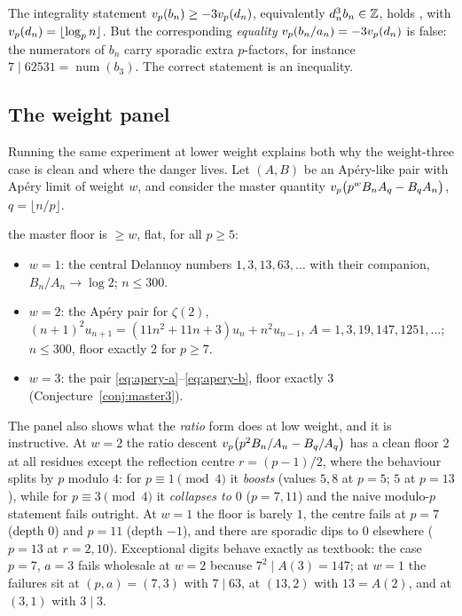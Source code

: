 \begin{observation}\label{obs:false2}
The integrality statement $v_p(b_n)\ge-3v_p(d_n)$, equivalently $d_n^3b_n\in\mathbb{Z}$, holds
, with $v_p(d_n)=\lfloor\log_pn\rfloor$.
But the corresponding \emph{equality} $v_p(b_n/a_n)=-3v_p(d_n)$ is false: the numerators
of $b_n$ carry sporadic extra $p$-factors, for instance $7\mid62531=\operatorname{num}(b_3)$.
The correct statement is an inequality.
\end{observation}

\subsection{The weight panel}
\label{ssec:panel}

Running the same experiment at lower weight explains both why the weight-three case is
clean and where the danger lives. Let $(A,B)$ be an Ap\'ery-like pair with Ap\'ery limit
of weight $w$, and consider the master quantity $v_p\bigl(p^wB_nA_q-B_qA_n\bigr)$,
$q=\lfloor n/p\rfloor$.

\begin{observation}[congruence depth $=$ weight]\label{obs:panel}
 the master floor is $\ge w$, flat, for all $p\ge5$:
\begin{itemize}[leftmargin=1.4em]
\item $w=1$: the central Delannoy numbers $1,3,13,63,\dots$ with their companion,
  $B_n/A_n\to\log2$; $n\le300$.
\item $w=2$: the Ap\'ery pair for $\zeta(2)$, $(n+1)^2u_{n+1}=(11n^2+11n+3)u_n+n^2u_{n-1}$,
  $A=1,3,19,147,1251,\dots$; $n\le300$, floor exactly $2$ for $p\ge7$.
\item $w=3$: the pair \eqref{eq:apery-a}--\eqref{eq:apery-b}, floor exactly $3$
  (Conjecture~\ref{conj:master3}).
\end{itemize}
\end{observation}

The panel also shows what the \emph{ratio} form does at low weight, and it is instructive.
At $w=2$ the ratio descent $v_p\bigl(p^2B_n/A_n-B_q/A_q\bigr)$ has a clean floor $2$ at
all residues except the reflection centre $r=(p-1)/2$, where the behaviour splits by $p$
modulo $4$: for $p\equiv1\pmod4$ it \emph{boosts} (values $5,8$ at $p=5$; $5$ at $p=13$),
while for $p\equiv3\pmod4$ it \emph{collapses to $0$} ($p=7,11$) and the naive modulo-$p$
statement fails outright. At $w=1$ the floor is barely $1$, the centre fails at $p=7$
(depth $0$) and $p=11$ (depth $-1$), and there are sporadic dips to $0$ elsewhere ($p=13$
at $r=2,10$). Exceptional digits behave exactly as textbook: the case $p=7$, $a=3$ fails
wholesale at $w=2$ because $7^2\mid A(3)=147$; at $w=1$ the failures sit at
$(p,a)=(7,3)$ with $7\mid63$, at $(13,2)$ with $13=A(2)$, and at $(3,1)$ with $3\mid3$.


